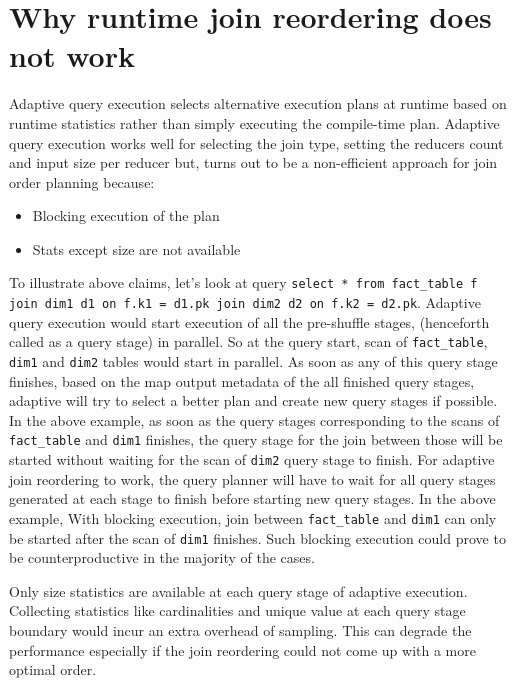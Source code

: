 \section{Why runtime join reordering does not work}
Adaptive query execution selects alternative execution plans at runtime based on runtime statistics rather than simply executing the compile-time plan. Adaptive query execution works well for selecting the join type, setting the reducers count and input size per reducer but, turns out to be a non-efficient approach for join order planning because:
\begin{itemize}
    \item Blocking execution of the plan
    \item Stats except size are not available
\end{itemize}

To illustrate above claims, let's look at query \texttt{select * from fact\_table f join dim1 d1 on f.k1 = d1.pk join dim2 d2 on f.k2 = d2.pk}. Adaptive query execution would start execution of all the pre-shuffle stages, (henceforth called as a query stage) in parallel. So at the query start, scan of \texttt{fact\_table}, \texttt{dim1}  and \texttt{dim2} tables would start in parallel. As soon as any of this query stage finishes, based on the map output metadata of the all finished query stages, adaptive will try to select a better plan and create new query stages if possible. In the above example, as soon as the query stages corresponding to the scans of \texttt{fact\_table} and \texttt{dim1} finishes, the query stage for the join between those will be started without waiting for the scan of \texttt{dim2} query stage to finish. For adaptive join reordering to work, the query planner will have to wait for all query stages generated at each stage to finish before starting new query stages. In the above example, With blocking execution, join between \texttt{fact\_table} and \texttt{dim1} can only be started after the scan of \texttt{dim1} finishes. Such blocking execution could prove to be counterproductive in the majority of the cases.

Only size statistics are available at each query stage of adaptive execution. Collecting statistics like cardinalities and unique value at each query stage boundary would incur an extra overhead of sampling. This can degrade the performance especially if the join reordering could not come up with a more optimal order.